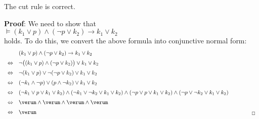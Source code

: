 \begin{Theorem}
  The cut rule is correct.
\end{Theorem}
\textbf{Proof}: We need to show that
\\[0.2cm]
\hspace*{1.3cm}
$\models (k_1 \vee p) \wedge (\neg p \vee k_2) \rightarrow k_1 \vee k_2$
\\[0.2cm]
holds. To do this, we convert the above formula into conjunctive normal form:
$$
\begin{array}{ll}
  & (k_1 \vee p) \wedge (\neg p \vee k_2) \rightarrow k_1 \vee k_2  \\[0.2cm]
\Leftrightarrow  & 
    \neg \bigl( (k_1 \vee p) \wedge (\neg p \vee k_2) \bigr) \vee k_1 \vee k_2 \\[0.2cm]
\Leftrightarrow  & 
    \neg (k_1 \vee p) \vee \neg (\neg p \vee k_2) \vee k_1 \vee k_2 \\[0.2cm]
\Leftrightarrow  & 
     (\neg k_1 \wedge \neg p) \vee  (p \wedge \neg k_2) \vee k_1 \vee k_2 \\[0.2cm]
\Leftrightarrow  & 
     (\neg k_1 \vee p \vee k_1 \vee k_2)  \wedge 
     (\neg k_1 \vee \neg k_2 \vee k_1 \vee k_2)  \wedge 
     (\neg p \vee p \vee k_1 \vee k_2)  \wedge 
     (\neg p \vee \neg k_2 \vee k_1 \vee k_2) 
      \\[0.2cm]
\Leftrightarrow  & 
     \verum  \wedge 
     \verum  \wedge 
     \verum  \wedge 
     \verum 
      \\[0.2cm]
\Leftrightarrow  & 
     \verum    \hspace*{13.5cm} _\Box
      \\
\end{array}
$$



